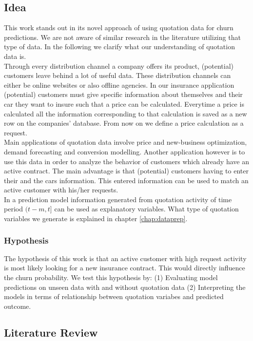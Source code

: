 \documentclass[12pt,titlepage]{article}
\begin{document}
\subsection{Idea} \par

This work stands out in its novel approach of using quotation data for churn predictions. We are not aware of similar research in the literature utilizing that type of data. In the following we clarify what our understanding of quotation data is. \\
Through every distribution channel a company offers its product, (potential) customers leave behind a lot of useful data. These distribution channels can either be online websites or also offline agencies. In our insurance application (potential) customers must give specific information about themselves and their car they want to insure such that a price can be calculated. Everytime a price is calculated all the information corresponding to that calculation is saved as a new row on the companies' database. From now on we define a price calculation as a request. \\
Main applications of quotation data involve price and new-business optimization, demand forecasting and conversion modelling. Another application however is to use this data in order to analyze the behavior of customers which already have an active contract. The main advantage is that (potential) customers having to enter their and the cars information. This entered information can be used to match an active customer with his/her requests. \\
In a prediction model information generated from quotation activity of time period $(t-m, t]$ can be used as explanatory variables. What type of quotation variables we generate is explained in chapter \ref{chap:dataprep}. \\
\subsubsection*{Hypothesis}
The hypothesis of this work is that an active customer with high request activity is most likely looking for a new insurance contract. This would directly influence the churn probability. We test this hypothesis by: (1) Evaluating model predictions on unseen data with and without quotation data (2) Interpreting the models in terms of relationship between quotation variabes and predicted outcome. \\

\subsection{Literature Review} \par
\end{document}
